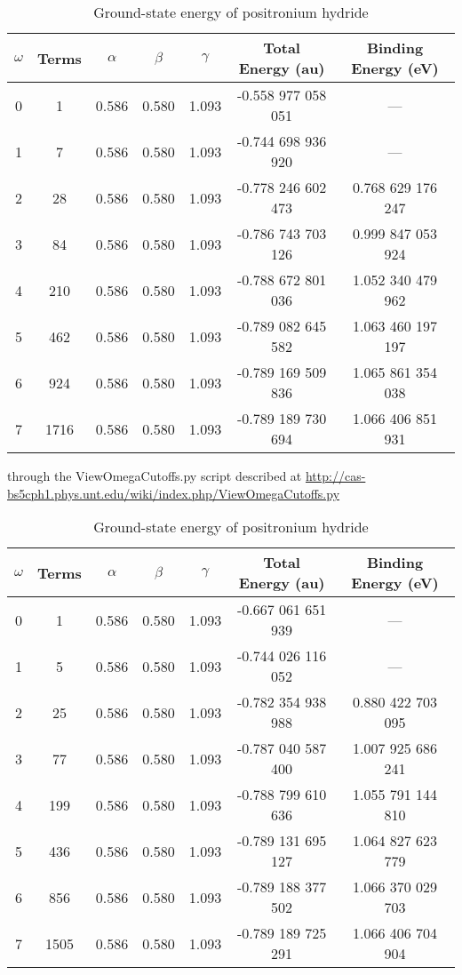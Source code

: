 \documentclass[Dissertation.tex]{subfiles}
\begin{document}
\setlength{\abovecaptionskip}{6pt}   %
\setlength{\belowcaptionskip}{6pt}   %
\begin{table}[H]
\centering
\begin{tabular}{c c c c c c c}
\toprule
$\omega$ & Terms & $\alpha$ & $\beta$ & $\gamma$ & Total Energy (au) & Binding Energy (eV) \\ [0.5ex]
\midrule
0 & 1 & 0.586 & 0.580 & 1.093 & -0.558 977 058 051 & --- \\
1 & 7 & 0.586 & 0.580 & 1.093 & -0.744 698 936 920 & --- \\
2 & 28 & 0.586 & 0.580 & 1.093 & -0.778 246 602 473 & 0.768 629 176 247 \\
3 & 84 & 0.586 & 0.580 & 1.093 & -0.786 743 703 126 & 0.999 847 053 924 \\
4 & 210 & 0.586 & 0.580 & 1.093 & -0.788 672 801 036 & 1.052 340 479 962 \\
5 & 462 & 0.586 & 0.580 & 1.093 & -0.789 082 645 582 & 1.063 460 197 197 \\
6 & 924 & 0.586 & 0.580 & 1.093 & -0.789 169 509 836 & 1.065 861 354 038 \\
7 & 1716 & 0.586 & 0.580 & 1.093 & -0.789 189 730 694 & 1.066 406 851 931 \\
\bottomrule
\end{tabular}
\caption{Ground-state energy of positronium hydride} %
\label{tab:BoundEnergy1}
\end{table}

through the ViewOmegaCutoffs.py script described at \url{http://cas-bs5cph1.phys.unt.edu/wiki/index.php/ViewOmegaCutoffs.py}

\setlength{\abovecaptionskip}{6pt}   %
\setlength{\belowcaptionskip}{6pt}   %
\begin{table}[H]
\centering
\begin{tabular}{c c c c c c c}
\toprule
$\omega$ & Terms & $\alpha$ & $\beta$ & $\gamma$ & Total Energy (au) & Binding Energy (eV) \\ [0.5ex]
\midrule
0 & 1 & 0.586 & 0.580 & 1.093 & -0.667 061 651 939 & --- \\
1 & 5 & 0.586 & 0.580 & 1.093 & -0.744 026 116 052 & --- \\
2 & 25 & 0.586 & 0.580 & 1.093 & -0.782 354 938 988 & 0.880 422 703 095 \\
3 & 77 & 0.586 & 0.580 & 1.093 & -0.787 040 587 400 & 1.007 925 686 241 \\
4 & 199 & 0.586 & 0.580 & 1.093 & -0.788 799 610 636 & 1.055 791 144 810 \\
5 & 436 & 0.586 & 0.580 & 1.093 & -0.789 131 695 127 & 1.064 827 623 779 \\
6 & 856 & 0.586 & 0.580 & 1.093 & -0.789 188 377 502 & 1.066 370 029 703 \\
7 & 1505 & 0.586 & 0.580 & 1.093 & -0.789 189 725 291 & 1.066 406 704 904 \\
\bottomrule
\end{tabular}
\caption{Ground-state energy of positronium hydride} %
\label{tab:BoundEnergyTodd1}
\end{table}
\end{document}
